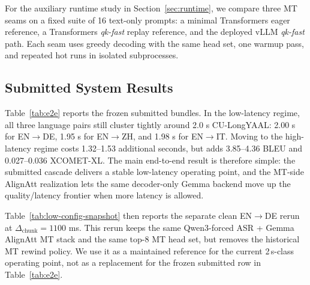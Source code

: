 \documentclass[11pt]{article}
\begin{document}
For the auxiliary runtime study in Section~\ref{sec:runtime}, we compare three
MT seams on a fixed suite of 16 text-only prompts: a minimal Transformers eager
reference, a Transformers \emph{qk-fast} replay reference, and the deployed
vLLM \emph{qk-fast} path. Each seam uses greedy decoding with the same head
set, one warmup pass, and repeated hot runs in isolated subprocesses.

\subsection{Submitted System Results}
\label{sec:main-results}

Table~\ref{tab:e2e} reports the frozen submitted bundles. In the low-latency
regime, all three language pairs still cluster tightly around 2.0 s
CU-LongYAAL: 2.00 s for EN$\to$DE, 1.95 s for EN$\to$ZH, and 1.98 s for
EN$\to$IT. Moving to the high-latency regime
costs 1.32--1.53 additional seconds, but adds 3.85--4.36 BLEU and
0.027--0.036 XCOMET-XL. The main end-to-end result is therefore simple: the
submitted cascade delivers a stable low-latency operating point, and the
MT-side AlignAtt realization lets the same decoder-only Gemma backend move up
the quality/latency frontier when more latency is allowed.

Table~\ref{tab:low-config-snapshot} then reports the separate clean EN$\to$DE
rerun at $\Delta_{\mathrm{chunk}}=1100$ ms. This rerun keeps the same
Qwen3-forced ASR + Gemma AlignAtt MT stack and the same top-8 MT head set, but
removes the historical MT rewind policy. We use it as a maintained reference
for the current 2\,s-class operating point, not as a replacement for the
frozen submitted row in Table~\ref{tab:e2e}.
\end{document}
